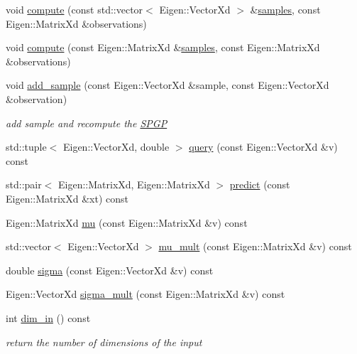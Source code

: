 \begin{DoxyCompactItemize}
void \hyperlink{classlimbo_1_1model_1_1_s_p_g_p_a4e05bf3a425ddd15fb0ad44b28bc2d56}{compute} (const std\+::vector$<$ Eigen\+::\+Vector\+Xd $>$ \&\hyperlink{classlimbo_1_1model_1_1_s_p_g_p_a867505eb41e8fe971eb7de28b2cea50f}{samples}, const Eigen\+::\+Matrix\+Xd \&observations)
\item 
void \hyperlink{classlimbo_1_1model_1_1_s_p_g_p_acd0309a5bb2380abc49d0fa26db1e631}{compute} (const Eigen\+::\+Matrix\+Xd \&\hyperlink{classlimbo_1_1model_1_1_s_p_g_p_a867505eb41e8fe971eb7de28b2cea50f}{samples}, const Eigen\+::\+Matrix\+Xd \&observations)
\item 
void \hyperlink{classlimbo_1_1model_1_1_s_p_g_p_a4d983fbcf5c625446065dbc939571c3d}{add\+\_\+sample} (const Eigen\+::\+Vector\+Xd \&sample, const Eigen\+::\+Vector\+Xd \&observation)
\begin{DoxyCompactList}\small\item\em add sample and recompute the \hyperlink{classlimbo_1_1model_1_1_s_p_g_p}{S\+P\+GP} \end{DoxyCompactList}\item 
std\+::tuple$<$ Eigen\+::\+Vector\+Xd, double $>$ \hyperlink{classlimbo_1_1model_1_1_s_p_g_p_a42182a521e79e95b7e9cc4f1cd256650}{query} (const Eigen\+::\+Vector\+Xd \&v) const 
\item 
std\+::pair$<$ Eigen\+::\+Matrix\+Xd, Eigen\+::\+Matrix\+Xd $>$ \hyperlink{classlimbo_1_1model_1_1_s_p_g_p_ad699ef0c60c08ad24513d16d6c4f0c26}{predict} (const Eigen\+::\+Matrix\+Xd \&xt) const 
\item 
Eigen\+::\+Matrix\+Xd \hyperlink{classlimbo_1_1model_1_1_s_p_g_p_a93dc0f879b84a302382edf103fa00da9}{mu} (const Eigen\+::\+Matrix\+Xd \&v) const 
\item 
std\+::vector$<$ Eigen\+::\+Vector\+Xd $>$ \hyperlink{classlimbo_1_1model_1_1_s_p_g_p_ab7cd17b138cae0693ebec8101b401ee0}{mu\+\_\+mult} (const Eigen\+::\+Matrix\+Xd \&v) const 
\item 
double \hyperlink{classlimbo_1_1model_1_1_s_p_g_p_a69e98f453f5bcb2cf2c76469f91fab24}{sigma} (const Eigen\+::\+Vector\+Xd \&v) const 
\item 
Eigen\+::\+Vector\+Xd \hyperlink{classlimbo_1_1model_1_1_s_p_g_p_aed832adbf5fcfa305aac4699d809677e}{sigma\+\_\+mult} (const Eigen\+::\+Matrix\+Xd \&v) const 
\item 
int \hyperlink{classlimbo_1_1model_1_1_s_p_g_p_ab84d7663a814757766c2d630e0bacd9e}{dim\+\_\+in} () const 
\begin{DoxyCompactList}\small\item\em return the number of dimensions of the input \end{DoxyCompactList}\item 

\end{DoxyCompactItemize}

